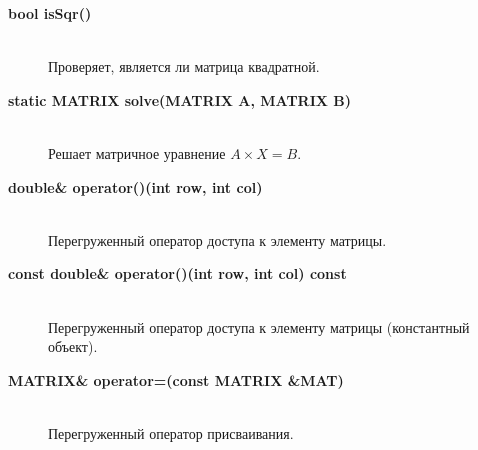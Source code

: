 \documentclass{article}
\begin{document}
\begin{description}
    \item[\textbf{bool isSqr()}] \hfill \\
    Проверяет, является ли матрица квадратной.
    
    \item[\textbf{static MATRIX solve(MATRIX A, MATRIX B)}] \hfill \\
    Решает матричное уравнение \(A \times X = B\).
    
    \item[\textbf{double\& operator()(int row, int col)}] \hfill \\
    Перегруженный оператор доступа к элементу матрицы.
    
    \item[\textbf{const double\& operator()(int row, int col) const}] \hfill \\
    Перегруженный оператор доступа к элементу матрицы (константный объект).
    
    \item[\textbf{MATRIX\& operator=(const MATRIX \&MAT)}] \hfill \\
    Перегруженный оператор присваивания.
\end{description}
\end{document}
